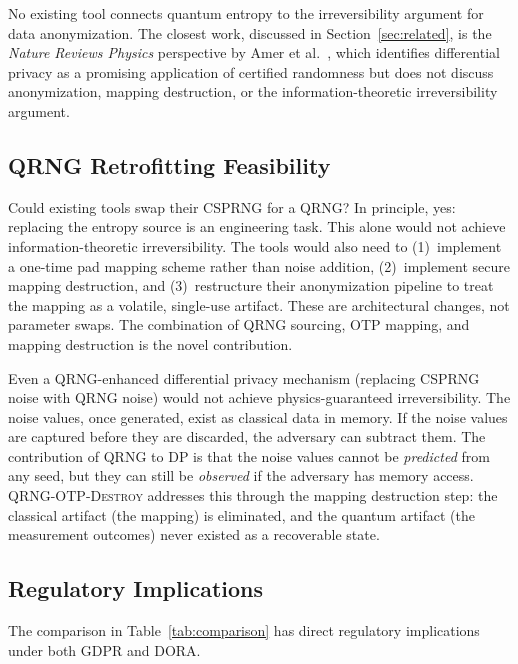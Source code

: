 \documentclass[journal]{IEEEtran}
\begin{document}
No existing tool connects quantum entropy to the irreversibility argument for data anonymization. The closest work, discussed in Section~\ref{sec:related}, is the \emph{Nature Reviews Physics} perspective by Amer et al.~\cite{amer2025certified}, which identifies differential privacy as a promising application of certified randomness but does not discuss anonymization, mapping destruction, or the information-theoretic irreversibility argument.

\subsection{QRNG Retrofitting Feasibility}
\label{subsec:retrofit}

Could existing tools swap their CSPRNG for a QRNG? In principle, yes: replacing the entropy source is an engineering task. This alone would not achieve information-theoretic irreversibility. The tools would also need to (1)~implement a one-time pad mapping scheme rather than noise addition, (2)~implement secure mapping destruction, and (3)~restructure their anonymization pipeline to treat the mapping as a volatile, single-use artifact. These are architectural changes, not parameter swaps. The combination of QRNG sourcing, OTP mapping, and mapping destruction is the novel contribution.

Even a QRNG-enhanced differential privacy mechanism (replacing CSPRNG noise with QRNG noise) would not achieve physics-guaranteed irreversibility. The noise values, once generated, exist as classical data in memory. If the noise values are captured before they are discarded, the adversary can subtract them. The contribution of QRNG to DP is that the noise values cannot be \emph{predicted} from any seed, but they can still be \emph{observed} if the adversary has memory access. \textsc{QRNG-OTP-Destroy} addresses this through the mapping destruction step: the classical artifact (the mapping) is eliminated, and the quantum artifact (the measurement outcomes) never existed as a recoverable state.

\subsection{Regulatory Implications}
\label{subsec:regulatory}

The comparison in Table~\ref{tab:comparison} has direct regulatory implications under both GDPR and DORA.
\end{document}
